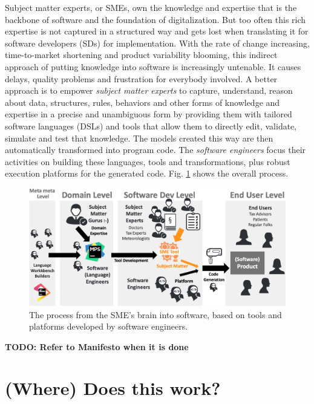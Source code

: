 \documentclass[runningheads]{llncs}
\newcommand{\fig}[1]{Fig. \ref{#1}}  %
\newcommand\todo[1]{\vspace{1mm}\noindent\textbf{\color{red} {{TODO: {#1}} }}}
\begin{document}
Subject matter experts, or SMEs, own the knowledge and expertise that is the
backbone of software and the foundation of digitalization. But too often this
rich expertise is not captured in a structured way and gets lost when
translating it for software developers (SDs) for implementation. With the rate
of change increasing, time-to-market shortening and product variability
blooming, this indirect approach of putting knowledge into software is
increasingly untenable. It causes delays, quality problems and frustration for
everybody involved. A better approach is to empower \emph{subject matter
experts} to capture, understand, reason about data, structures, rules, behaviors
and other forms of knowledge and expertise in a precise and unambiguous form by
providing them with tailored software languages (DSLs) and tools that allow them
to directly edit, validate, simulate and test that knowledge. The models created
this way are then automatically transformed into program code. The
\emph{software engineers} focus their activities on building these languages,
tools and transformations, plus robust execution platforms for the generated
code. \fig{bigpic} shows the overall process.

\begin{figure}
\begin{center}
    \includegraphics[width=1\columnwidth]{figures/bigpic.png}
    \caption{The process from the SME's brain into software, based on
    tools and platforms developed by software engineers.}
    \label{bigpic}
\end{center} 
\end{figure} 

\todo{Refer to Manifesto when it is done}

\section{(Where) Does this work?}
\end{document}
